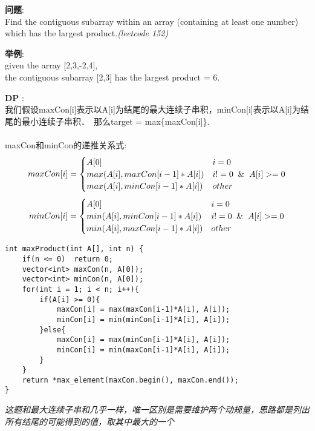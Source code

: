     
\begin{description}
    \item{\textbf{问题}}:\\
Find the contiguous subarray within an array (containing at least one number) which has the largest product.\textit{(leetcode 152)}

    \item{\textbf{举例}}:\\
given the array [2,3,-2,4],\\
the contiguous subarray [2,3] has the largest product = 6.\\
    \item{\textbf{DP}} : 
	\\我们假设maxCon[i]表示以A[i]为结尾的最大连续子串积，minCon[i]表示以A[i]为结尾的最小连续子串积．　那么target = max\{maxCon[i]\}.\\
	\\maxCon和minCon的递推关系式:
$$
maxCon[i] =
\begin{cases} 
A[0] & i = 0 \\
max(A[i], maxCon[i-1]*A[i]) & i != 0 \And A[i] >= 0\\
max(A[i], minCon[i-1]*A[i]) & other
\end{cases}
$$
$$
minCon[i] =
\begin{cases} 
A[0] & i = 0 \\
min(A[i], minCon[i-1]*A[i]) & i != 0 \And A[i] >= 0\\
min(A[i], maxCon[i-1]*A[i]) & other
\end{cases}
$$
    \begin{lstlisting}
int maxProduct(int A[], int n) {
	if(n <= 0)	return 0;
	vector<int> maxCon(n, A[0]);
	vector<int> minCon(n, A[0]);
	for(int i = 1; i < n; i++){
		if(A[i] >= 0){
			maxCon[i] = max(maxCon[i-1]*A[i], A[i]);
			minCon[i] = min(minCon[i-1]*A[i], A[i]);
		}else{
			maxCon[i] = max(minCon[i-1]*A[i], A[i]);
			minCon[i] = min(maxCon[i-1]*A[i], A[i]);
		}
	}
	return *max_element(maxCon.begin(), maxCon.end());
}
    \end{lstlisting}
	\textit{这题和最大连续子串和几乎一样，唯一区别是需要维护两个动规量，思路都是列出所有结尾的可能得到的值，取其中最大的一个}
\end{description}

